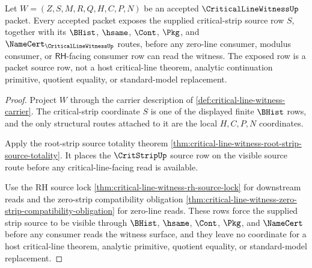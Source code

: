 \begin{theorem}
\label{thm:critical-line-witness-critical-strip-source}
Let $W=(Z,S,M,R,Q,H,C,P,N)$ be an accepted $\CriticalLineWitnessUp$ packet.
Every accepted packet exposes the supplied critical-strip source row $S$,
together with its $\BHist$, $\hsame$, $\Cont$, $\Pkg$, and
$\NameCert_{\CriticalLineWitnessUp}$ routes, before any zero-line consumer,
modulus consumer, or $\mathsf{RH}$-facing consumer row can read the witness.
The exposed row is a packet source row, not a host critical-line theorem,
analytic continuation primitive, quotient equality, or standard-model
replacement.
\end{theorem}
\begin{proof}
Project $W$ through the carrier description of
\autoref{def:critical-line-witness-carrier}. The critical-strip coordinate
$S$ is one of the displayed finite $\BHist$ rows, and the only structural
routes attached to it are the local $H,C,P,N$ coordinates.

Apply the root-strip source totality theorem
\autoref{thm:critical-line-witness-root-strip-source-totality}. It places the
$\CritStripUp$ source row on the visible source route before any
critical-line-facing read is available.

Use the RH source lock
\autoref{thm:critical-line-witness-rh-source-lock} for downstream reads and
the zero-strip compatibility obligation
\autoref{thm:critical-line-witness-zero-strip-compatibility-obligation} for
zero-line reads. These rows force the supplied strip source to be visible
through $\BHist$, $\hsame$, $\Cont$, $\Pkg$, and $\NameCert$ before any
consumer reads the witness surface, and they leave no coordinate for a host
critical-line theorem, analytic primitive, quotient equality, or
standard-model replacement.
\end{proof}

